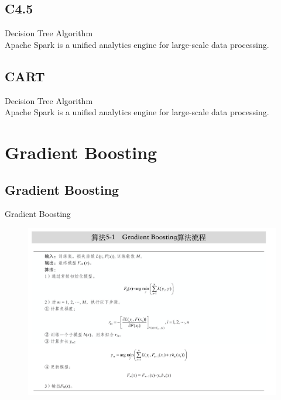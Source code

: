 \subsection{C4.5}
\begin{frame}[plain,t]{Decision Tree Algorithm} %
     \\  \vspace{2ex}
    Apache Spark is a unified analytics engine for large-scale data processing.
    
    
    
    
\end{frame}
\subsection{CART}
\begin{frame}[plain,t]{Decision Tree Algorithm} %
     \\  \vspace{2ex}
    Apache Spark is a unified analytics engine for large-scale data processing.
    
    
    
\end{frame}

\section{Gradient Boosting}
\subsection{Gradient Boosting}
\begin{frame}[plain,t]{Gradient Boosting} %
     \\  
   
    \begin{figure}
        \centering
        \includegraphics[width=0.9\linewidth]{images/gb1}
        \label{fig:gb1}
    \end{figure}
    
    
    
    
\end{frame}

